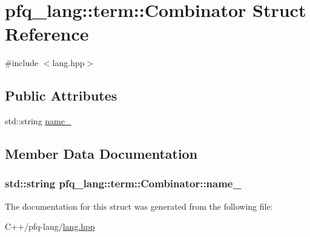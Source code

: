 \hypertarget{structpfq__lang_1_1term_1_1Combinator}{\section{pfq\-\_\-lang\-:\-:term\-:\-:Combinator Struct Reference}
\label{structpfq__lang_1_1term_1_1Combinator}
}


{\ttfamily \#include $<$lang.\-hpp$>$}

\subsection*{Public Attributes}
\begin{DoxyCompactItemize}
\item 
std\-::string \hyperlink{structpfq__lang_1_1term_1_1Combinator_a8146794f91b1cb3424dc981ac9313f45}{name\-\_\-}
\end{DoxyCompactItemize}


\subsection{Member Data Documentation}
\hypertarget{structpfq__lang_1_1term_1_1Combinator_a8146794f91b1cb3424dc981ac9313f45}{
\subsubsection[{name\-\_\-}]{\setlength{\rightskip}{0pt plus 5cm}std\-::string pfq\-\_\-lang\-::term\-::\-Combinator\-::name\-\_\-}}\label{structpfq__lang_1_1term_1_1Combinator_a8146794f91b1cb3424dc981ac9313f45}


The documentation for this struct was generated from the following file\-:\begin{DoxyCompactItemize}
\item 
C++/pfq-\/lang/\hyperlink{lang_8hpp}{lang.\-hpp}\end{DoxyCompactItemize}
